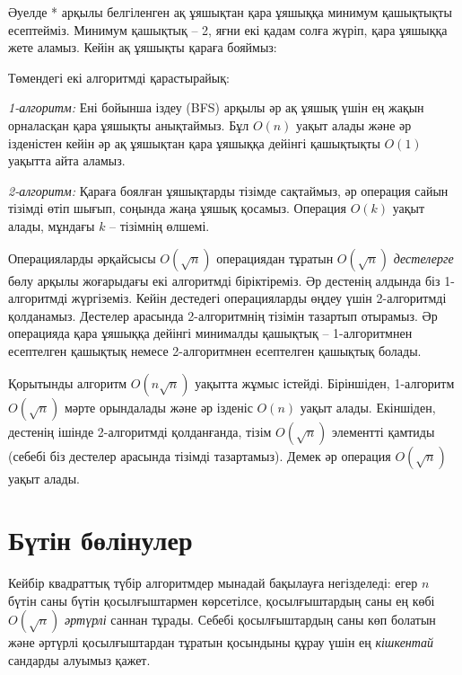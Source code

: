 Әуелде * арқылы белгіленген ақ ұяшықтан
қара ұяшыққа минимум қашықтықты есептейміз.
Минимум қашықтық -- 2, яғни екі қадам солға жүріп,
қара ұяшыққа жете аламыз. Кейін ақ ұяшықты
қараға бояймыз:

\begin{center}
\end{center}

Төмендегі екі алгоритмді қарастырайық:

\emph{1-алгоритм:} Ені бойынша іздеу (BFS) арқылы 
әр ақ ұяшық үшін ең жақын орналасқан қара ұяшықты 
анықтаймыз. Бұл $O(n)$ уақыт алады және әр ізденістен кейін
әр ақ ұяшықтан қара ұяшыққа дейінгі қашықтықты $O(1)$ уақытта
айта аламыз.

\emph{2-алгоритм:} Қараға боялған ұяшықтарды 
тізімде сақтаймыз, әр операция сайын тізімді 
өтіп шығып, соңында жаңа ұяшық қосамыз.
Операция $O(k)$ уақыт алады, мұндағы $k$ -- тізімнің өлшемі.

Операцияларды әрқайсысы $O(\sqrt n)$ операциядан
тұратын $O(\sqrt n)$ \emph{дестелерге}
бөлу арқылы жоғарыдағы екі алгоритмді біріктіреміз. 
Әр дестенің алдында біз 1-алгоритмді жүргіземіз.
Кейін дестедегі операцияларды өңдеу үшін 
2-алгоритмді қолданамыз. Дестелер арасында
2-алгоритмнің тізімін тазартып отырамыз. 
Әр операцияда қара ұяшыққа дейінгі минималды қашықтық --
1-алгоритмнен есептелген қашықтық немесе
2-алгоритмнен есептелген қашықтық болады. 

Қорытынды алгоритм $O(n \sqrt n)$ уақытта
жұмыс істейді. Біріншіден, 1-алгоритм $O(\sqrt n)$ мәрте
орындалады және әр ізденіс $O(n)$ уақыт алады.
Екіншіден, дестенің ішінде 2-алгоритмді қолданғанда,
тізім $O(\sqrt n)$ элементті қамтиды (себебі біз
дестелер арасында тізімді тазартамыз).
Демек әр операция $O(\sqrt n)$ уақыт алады. 

\section{Бүтін бөлінулер}

Кейбір квадраттық түбір алгоритмдер 
мынадай бақылауға негізделеді:
егер $n$ бүтін саны бүтін қосылғыштармен
көрсетілсе, қосылғыштардың саны 
ең көбі $O(\sqrt n)$
\emph{әртүрлі} саннан тұрады. 
Себебі қосылғыштардың саны көп болатын және
әртүрлі қосылғыштардан тұратын қосындыны 
құрау үшін ең \emph{кішкентай}
сандарды алуымыз қажет.

